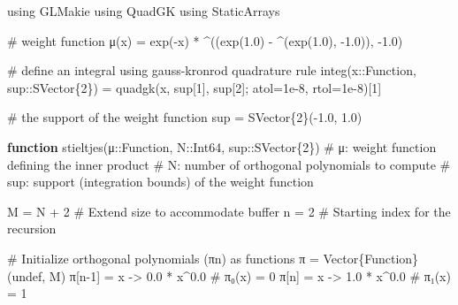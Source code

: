 \documentclass[
]{article}
\newenvironment{Shaded}{\begin{snugshade}}{\end{snugshade}}
\newcommand{\BuiltInTok}[1]{\textcolor[rgb]{0.00,0.23,0.31}{#1}}
\newcommand{\CommentTok}[1]{\textcolor[rgb]{0.37,0.37,0.37}{#1}}
\newcommand{\ConstantTok}[1]{\textcolor[rgb]{0.56,0.35,0.01}{#1}}
\newcommand{\DataTypeTok}[1]{\textcolor[rgb]{0.68,0.00,0.00}{#1}}
\newcommand{\FloatTok}[1]{\textcolor[rgb]{0.68,0.00,0.00}{#1}}
\newcommand{\FunctionTok}[1]{\textcolor[rgb]{0.28,0.35,0.67}{#1}}
\newcommand{\ImportTok}[1]{\textcolor[rgb]{0.00,0.46,0.62}{#1}}
\newcommand{\KeywordTok}[1]{\textcolor[rgb]{0.00,0.23,0.31}{\textbf{#1}}}
\newcommand{\NormalTok}[1]{\textcolor[rgb]{0.00,0.23,0.31}{#1}}
\newcommand{\OperatorTok}[1]{\textcolor[rgb]{0.37,0.37,0.37}{#1}}
\begin{document}
\begin{Shaded}
\begin{Highlighting}[]
\ImportTok{using} \BuiltInTok{GLMakie}
\ImportTok{using} \BuiltInTok{QuadGK}
\ImportTok{using} \BuiltInTok{StaticArrays}

\CommentTok{\# weight function}
\FunctionTok{μ}\NormalTok{(x) }\OperatorTok{=} \FunctionTok{exp}\NormalTok{(}\OperatorTok{{-}}\NormalTok{x) }\OperatorTok{*} \OperatorTok{\^{}}\NormalTok{((}\FunctionTok{exp}\NormalTok{(}\FloatTok{1.0}\NormalTok{) }\OperatorTok{{-}} \OperatorTok{\^{}}\NormalTok{(}\FunctionTok{exp}\NormalTok{(}\FloatTok{1.0}\NormalTok{), }\OperatorTok{{-}}\FloatTok{1.0}\NormalTok{)), }\OperatorTok{{-}}\FloatTok{1.0}\NormalTok{)}

\CommentTok{\# define an integral using gauss{-}kronrod quadrature rule}
\FunctionTok{integ}\NormalTok{(x}\OperatorTok{::}\DataTypeTok{Function}\NormalTok{, sup}\OperatorTok{::}\DataTypeTok{SVector\{2\}}\NormalTok{) }\OperatorTok{=} \FunctionTok{quadgk}\NormalTok{(x, sup[}\FloatTok{1}\NormalTok{], sup[}\FloatTok{2}\NormalTok{]; atol}\OperatorTok{=}\FloatTok{1e{-}8}\NormalTok{, rtol}\OperatorTok{=}\FloatTok{1e{-}8}\NormalTok{)[}\FloatTok{1}\NormalTok{]}

\CommentTok{\# the support of the weight function}
\NormalTok{sup }\OperatorTok{=} \FunctionTok{SVector}\DataTypeTok{\{2\}}\NormalTok{(}\OperatorTok{{-}}\FloatTok{1.0}\NormalTok{, }\FloatTok{1.0}\NormalTok{)}

\KeywordTok{function} \FunctionTok{stieltjes}\NormalTok{(μ}\OperatorTok{::}\DataTypeTok{Function}\NormalTok{, N}\OperatorTok{::}\DataTypeTok{Int64}\NormalTok{, sup}\OperatorTok{::}\DataTypeTok{SVector\{2\}}\NormalTok{)}
    \CommentTok{\# μ: weight function defining the inner product}
    \CommentTok{\# N: number of orthogonal polynomials to compute}
    \CommentTok{\# sup: support (integration bounds) of the weight function}

\NormalTok{    M }\OperatorTok{=}\NormalTok{ N }\OperatorTok{+} \FloatTok{2}  \CommentTok{\# Extend size to accommodate buffer}
\NormalTok{    n }\OperatorTok{=} \FloatTok{2}      \CommentTok{\# Starting index for the recursion}

    \CommentTok{\# Initialize orthogonal polynomials (πn) as functions}
    \ConstantTok{π} \OperatorTok{=} \FunctionTok{Vector}\DataTypeTok{\{Function\}}\NormalTok{(}\ConstantTok{undef}\NormalTok{, M)}
    \ConstantTok{π}\NormalTok{[n}\OperatorTok{{-}}\FloatTok{1}\NormalTok{] }\OperatorTok{=}\NormalTok{ x }\OperatorTok{{-}\textgreater{}} \FloatTok{0.0} \OperatorTok{*}\NormalTok{ x}\OperatorTok{\^{}}\FloatTok{0.0}  \CommentTok{\# π₀(x) = 0}
    \ConstantTok{π}\NormalTok{[n] }\OperatorTok{=}\NormalTok{ x }\OperatorTok{{-}\textgreater{}} \FloatTok{1.0} \OperatorTok{*}\NormalTok{ x}\OperatorTok{\^{}}\FloatTok{0.0}    \CommentTok{\# π₁(x) = 1}


\end{Highlighting}
\end{Shaded}
\end{document}
